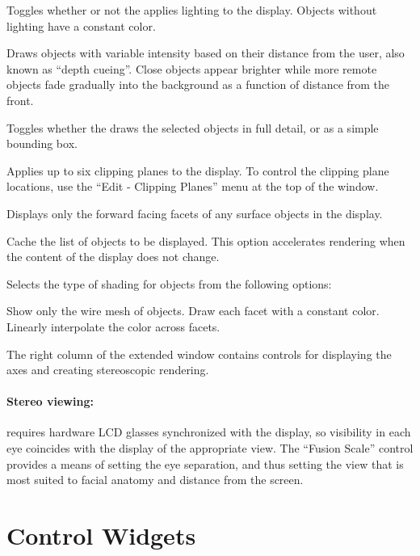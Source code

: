 \begin{description}
   Toggles whether or not the \viewer{} applies
  lighting to the display.  Objects without lighting have a constant
  color.
        
   Draws objects with variable intensity based on their
  distance from the user, also known as ``depth cueing''.  Close
  objects appear brighter while more remote objects fade gradually
  into the background as a function of distance from the front.
  
   Toggles whether the \viewer{} draws the selected
  objects in full detail, or as a simple bounding box.
  
   Applies up to six clipping planes to the
  display.  To control the clipping plane locations, use the ``Edit
  -\ra{} Clipping Planes'' menu at the top of the \viewer{} window.
  
   Displays only the forward facing facets of any
  surface objects in the display.
  
   Cache the list of objects to be displayed.
  This option accelerates rendering when the content of the display
  does not change.

   Selects the type of shading for objects from the
        following options:
        \begin{description}
           Show only the wire mesh of objects.
           Draw each facet with a constant color.
           Linearly interpolate the color across facets. 
        \end{description}
\end{description}

The right column of the extended \viewer{} window contains controls
for displaying the axes and creating stereoscopic rendering.  

\paragraph{Stereo viewing: } requires hardware LCD glasses synchronized
with the display, so visibility in each eye coincides with the
display of the appropriate view.  The ``Fusion Scale'' control provides a
means of setting the eye separation, and thus setting the view that is most
suited to facial anatomy and distance from the screen.

\section{Control Widgets}
\label{sec:view-widgets} 

